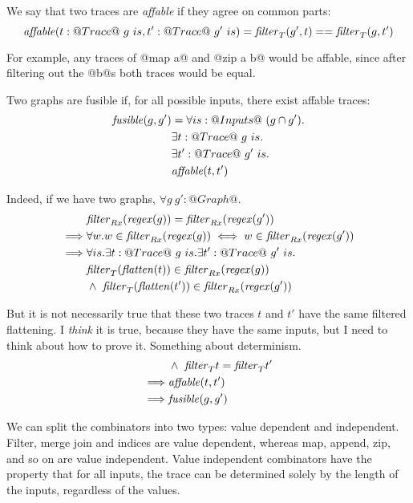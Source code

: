 We say that two traces are \emph{affable} if they agree on common parts:
\[ \mathit{affable}(t : @Trace@~g~is, t' : @Trace@~g'~is) = \mathit{filter}_{T}(g', t) == \mathit{filter}_{T}(g, t') \]

For example, any traces of @map a@ and @zip a b@ would be affable, since after filtering out the @b@s both traces would be equal.

Two graphs are fusible if, for all possible inputs, there exist affable traces:
\begin{align*}
\mathit{fusible}(g, g')
        &=  \forall is : @Inputs@~(g \cap g').  \\
        &   \exists t  : @Trace@~g~is.          \\
        &   \exists t' : @Trace@~g'~is.         \\
        &   \affable(t, t')                     %
\end{align*}


Indeed, if we have two graphs, $\forall g~g' : @Graph@.$
\begin{eqnarray*}
 & \mathit{filter}_{Rx}(\mathit{regex}(g)) = \mathit{filter}_{Rx}(\mathit{regex}(g')) \\
 \implies & \forall w. w \in \mathit{filter}_{Rx}(\mathit{regex}(g)) \iff w \in \mathit{filter}_{Rx}(\mathit{regex}(g')) \\
 \implies & \forall is. \exists t : @Trace@~g~is. \exists t' : @Trace@~g'~is. \\
          & \mathit{filter}_{T}(\mathit{flatten}(t)) \in \mathit{filter}_{Rx}(\mathit{regex}(g)) \\
          & \wedge~\mathit{filter}_{T}(\mathit{flatten}(t')) \in \mathit{filter}_{Rx}(\mathit{regex}(g')) \\
\end{eqnarray*}

But it is not necessarily true that these two traces $t$ and $t'$ have the same filtered flattening.
I \emph{think} it is true, because they have the same inputs, but I need to think about how to prove it.
Something about determinism.
\begin{eqnarray*}
          & \wedge~\mathit{filter}_{T} t = \mathit{filter}_{T} t' \\
 \implies & \mathit{affable}(t, t') \\
 \implies & \mathit{fusible}(g, g') \\
\end{eqnarray*}

We can split the combinators into two types: value dependent and independent.
Filter, merge join and indices are value dependent, whereas map, append, zip, and so on are value independent.
Value independent combinators have the property that for all inputs, the trace can be determined solely by the length of the inputs, regardless of the values.



